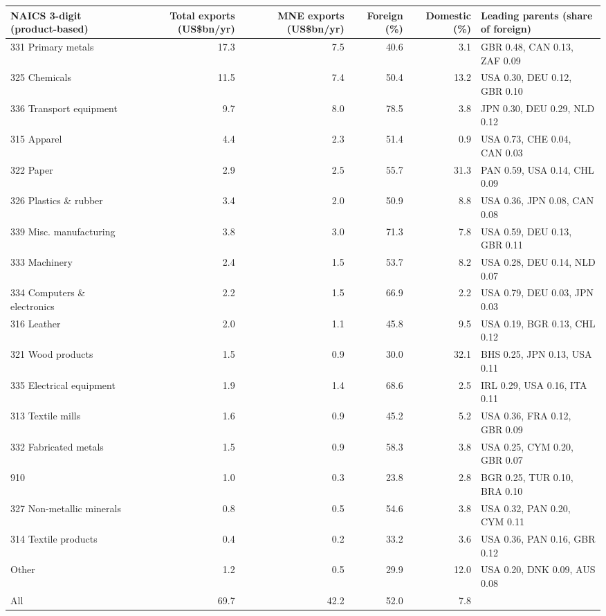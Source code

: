 \begin{tabular}{@{}l r r r r l@{}}
\toprule
NAICS 3-digit (product-based) & Total exports (US\$bn/yr) & MNE exports (US\$bn/yr) & Foreign (\%) & Domestic (\%) & Leading parents (share of foreign) \\
\midrule
331 Primary metals & 17.3 & 7.5 & 40.6 & 3.1 & GBR 0.48, CAN 0.13, ZAF 0.09 \\
325 Chemicals & 11.5 & 7.4 & 50.4 & 13.2 & USA 0.30, DEU 0.12, GBR 0.10 \\
336 Transport equipment & 9.7 & 8.0 & 78.5 & 3.8 & JPN 0.30, DEU 0.29, NLD 0.12 \\
315 Apparel & 4.4 & 2.3 & 51.4 & 0.9 & USA 0.73, CHE 0.04, CAN 0.03 \\
322 Paper & 2.9 & 2.5 & 55.7 & 31.3 & PAN 0.59, USA 0.14, CHL 0.09 \\
326 Plastics \& rubber & 3.4 & 2.0 & 50.9 & 8.8 & USA 0.36, JPN 0.08, CAN 0.08 \\
339 Misc. manufacturing & 3.8 & 3.0 & 71.3 & 7.8 & USA 0.59, DEU 0.13, GBR 0.11 \\
333 Machinery & 2.4 & 1.5 & 53.7 & 8.2 & USA 0.28, DEU 0.14, NLD 0.07 \\
334 Computers \& electronics & 2.2 & 1.5 & 66.9 & 2.2 & USA 0.79, DEU 0.03, JPN 0.03 \\
316 Leather & 2.0 & 1.1 & 45.8 & 9.5 & USA 0.19, BGR 0.13, CHL 0.12 \\
321 Wood products & 1.5 & 0.9 & 30.0 & 32.1 & BHS 0.25, JPN 0.13, USA 0.11 \\
335 Electrical equipment & 1.9 & 1.4 & 68.6 & 2.5 & IRL 0.29, USA 0.16, ITA 0.11 \\
313 Textile mills & 1.6 & 0.9 & 45.2 & 5.2 & USA 0.36, FRA 0.12, GBR 0.09 \\
332 Fabricated metals & 1.5 & 0.9 & 58.3 & 3.8 & USA 0.25, CYM 0.20, GBR 0.07 \\
910 & 1.0 & 0.3 & 23.8 & 2.8 & BGR 0.25, TUR 0.10, BRA 0.10 \\
327 Non-metallic minerals & 0.8 & 0.5 & 54.6 & 3.8 & USA 0.32, PAN 0.20, CYM 0.11 \\
314 Textile products & 0.4 & 0.2 & 33.2 & 3.6 & USA 0.36, PAN 0.16, GBR 0.12 \\
Other & 1.2 & 0.5 & 29.9 & 12.0 & USA 0.20, DNK 0.09, AUS 0.08 \\
\midrule
All & 69.7 & 42.2 & 52.0 & 7.8 & \\
\bottomrule
\end{tabular}
